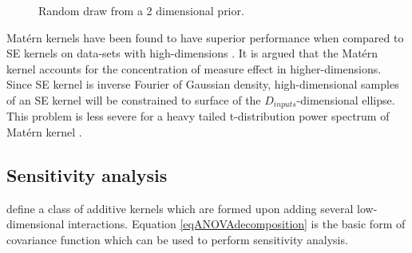 \begin{figure}[!ht]
  \centering
    \quad
{}\quad
       \caption{Random draw from a 2 dimensional prior.}
       \label{figPrior2dimensional}
\end{figure}


Mat\'ern kernels have been found to have superior performance when compared to SE kernels on data-sets with high-dimensions \cite{le2013fastfood}. It is argued that the Mat\'ern kernel accounts for the concentration of measure effect in higher-dimensions. Since SE kernel is inverse Fourier of Gaussian density, high-dimensional samples of an SE kernel will be constrained to surface of the $D_{inputs}$-dimensional ellipse. This problem is less severe for a heavy tailed t-distribution power spectrum of Mat\'ern kernel \cite{wilson2014thesis}. 

\subsection{Sensitivity analysis}
\cite{duvenaud2011additive, durrande2013anova, chastaing2015anova} define a class of additive kernels which are formed upon adding several low-dimensional interactions. Equation \ref{eqANOVAdecomposition} is the basic form of covariance function which can be used to perform sensitivity analysis.

